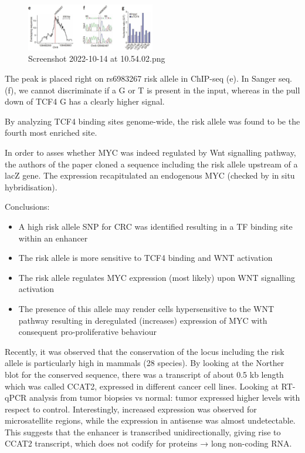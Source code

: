 \begin{figure}
\centering
\includegraphics[width=0.5\textwidth]{../_resources/Screenshot_2022-10-14_at_10-54-02.png}
\caption{Screenshot 2022-10-14 at 10.54.02.png}
\end{figure}

The peak is placed right on rs6983267 risk allele in ChIP-seq (e). In Sanger seq. (f), we cannot discriminate if a G or T is present in the input, whereas in the pull down of TCF4 G has a clearly higher signal.

By analyzing TCF4 binding sites genome-wide, the risk allele was found to be the fourth most enriched site.

In order to asses whether MYC was indeed regulated by Wnt signalling pathway, the authors of the paper cloned a sequence including the risk allele upstream of a lacZ gene. The expression recapitulated an endogenous MYC (checked by in situ hybridisation).

Conclusions:

\begin{itemize}
\tightlist
\item
  A high risk allele SNP for CRC was identified resulting in a TF binding site within an enhancer
\item
  The risk allele is more sensitive to TCF4 binding and WNT activation
\item
  The risk allele regulates MYC expression (most likely) upon WNT signalling activation
\item
  The presence of this allele may render cells hypersensitive to the WNT pathway resulting in deregulated (increases) expression of MYC with consequent pro-proliferative behaviour
\end{itemize}

Recently, it was observed that the conservation of the locus including the risk allele is particularly high in mammals (28 species). By looking at the Norther blot for the conserved sequence, there was a transcript of about 0.5 kb length which was called CCAT2, expressed in different cancer cell lines. Looking at RT-qPCR analysis from tumor biopsies vs normal: tumor expressed higher levels with respect to control. Interestingly, increased expression was observed for microsatellite regions, while the expression in antisense was almost undetectable. This suggests that the enhancer is transcribed unidirectionally, giving rise to CCAT2 transcript, which does not codify for proteins → long non-coding RNA.

